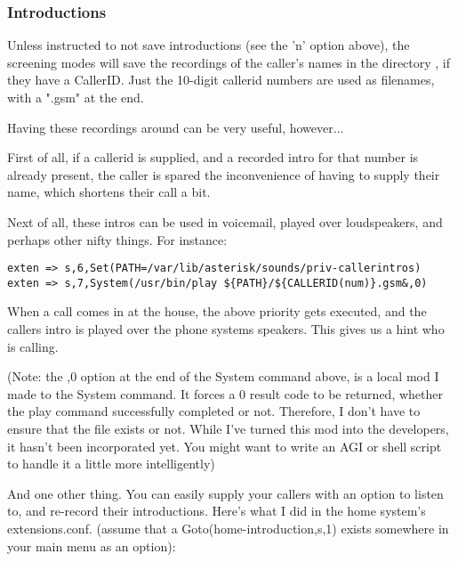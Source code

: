 \subsubsection{Introductions}
Unless instructed to not save introductions (see the 'n' option above),
the screening modes will save the recordings of the caller's names in
the directory , if they have
a CallerID.  Just the 10-digit callerid numbers are used as filenames,
with a ".gsm" at the end.

Having these recordings around can be very useful, however...

First of all, if a callerid is supplied, and a recorded intro for that
number is already present, the caller is spared the inconvenience of
having to supply their name, which shortens their call a bit.

Next of all, these intros can be used in voicemail, played over
loudspeakers, and perhaps other nifty things. For instance:

\begin{astlisting}
\begin{verbatim}
exten => s,6,Set(PATH=/var/lib/asterisk/sounds/priv-callerintros)
exten => s,7,System(/usr/bin/play ${PATH}/${CALLERID(num)}.gsm&,0)
\end{verbatim}
\end{astlisting}

When a call comes in at the house, the above priority gets executed,
and the callers intro is played over the phone systems speakers. This
gives us a hint who is calling.

(Note: the ,0 option at the end of the System command above, is a
local mod I made to the System command. It forces a 0 result code to
be returned, whether the play command successfully completed or
not. Therefore, I don't have to ensure that the file exists or
not. While I've turned this mod into the developers, it hasn't been
incorporated yet. You might want to write an AGI or shell script to
handle it a little more intelligently)

And one other thing. You can easily supply your callers with an option
to listen to, and re-record their introductions. Here's what I did in
the home system's extensions.conf. (assume that a
Goto(home-introduction,s,1) exists somewhere in your main menu as an
option):

